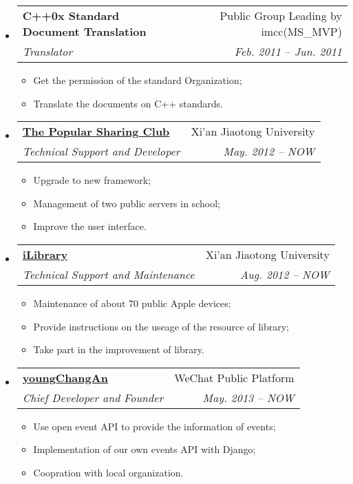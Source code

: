 \documentclass[letterpaper,11pt]{article}
\makeatletter
\newcommand{\resitem}[1]{\item #1 \vspace{-2pt}}
\newcommand{\ressubheading}[4]{
\begin{tabular*}{6.5in}{l@{\extracolsep{\fill}}r}
		\textbf{#1} & #2 \\
		\textit{#3} & \textit{#4} \\
\end{tabular*}\vspace{-6pt}}
\makeatother
\begin{document}
\begin{itemize}
{\begin{itemize}
				\end{itemize}
				}
		\item
			\ressubheading{C++0x Standard Document Translation}{Public Group Leading by imcc(MS\_MVP)}{Translator} {Feb. 2011 -- Jun. 2011}
				{ \footnotesize
				\begin{itemize}
					\resitem{Get the permission of the standard Organization;}
					\resitem{Translate the documents on C++ standards.}
				\end{itemize}
          		}
		\item 
			\ressubheading{\href{http://pt.xjtuns.cn/}{The Popular Sharing Club}}{Xi'an Jiaotong University}{Technical Support and Developer}{May. 2012 -- NOW}
				{ \footnotesize
				\begin{itemize}
					\resitem{Upgrade to new framework;}
					\resitem{Management of two public servers in school;}
					\resitem{Improve the user interface.}
				\end{itemize}
				}
		\item 
			\ressubheading{\href{http://www.lib.xjtu.edu.cn/}{iLibrary}}{Xi'an Jiaotong University}{Technical Support and Maintenance}{Aug. 2012 -- NOW}
				{ \footnotesize
				\begin{itemize}
					\resitem{Maintenance of about 70 public Apple devices;}
					\resitem{Provide instructions on the useage of the resource of library;}
					\resitem{Take part in the improvement of library.}
				\end{itemize}
				}
		\item 
			\ressubheading{\href{http://nanyang.xjtu.edu.cn/WeChat/note.html}{youngChangAn}}{WeChat Public Platform}{Chief Developer and Founder}{May. 2013 -- NOW}
				{ \footnotesize
				\begin{itemize}
					\resitem{Use open event API to provide the information of events;}
					\resitem{Implementation of our own events API with Django;}
					\resitem{Coopration with local organization.}
				\end{itemize}
				}
	\end{itemize}		
	
\end{document}

